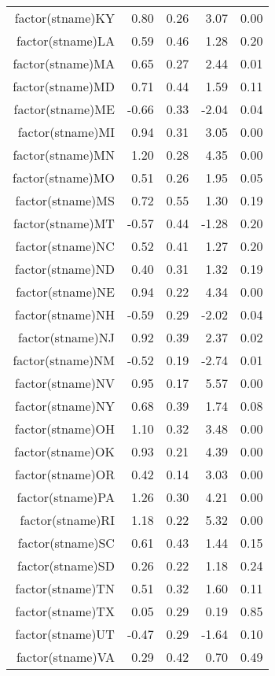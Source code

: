 \begin{table}[ht]
\begin{tabular}{rrrrr}
  factor(stname)KY & 0.80 & 0.26 & 3.07 & 0.00 \\ 
  factor(stname)LA & 0.59 & 0.46 & 1.28 & 0.20 \\ 
  factor(stname)MA & 0.65 & 0.27 & 2.44 & 0.01 \\ 
  factor(stname)MD & 0.71 & 0.44 & 1.59 & 0.11 \\ 
  factor(stname)ME & -0.66 & 0.33 & -2.04 & 0.04 \\ 
  factor(stname)MI & 0.94 & 0.31 & 3.05 & 0.00 \\ 
  factor(stname)MN & 1.20 & 0.28 & 4.35 & 0.00 \\ 
  factor(stname)MO & 0.51 & 0.26 & 1.95 & 0.05 \\ 
  factor(stname)MS & 0.72 & 0.55 & 1.30 & 0.19 \\ 
  factor(stname)MT & -0.57 & 0.44 & -1.28 & 0.20 \\ 
  factor(stname)NC & 0.52 & 0.41 & 1.27 & 0.20 \\ 
  factor(stname)ND & 0.40 & 0.31 & 1.32 & 0.19 \\ 
  factor(stname)NE & 0.94 & 0.22 & 4.34 & 0.00 \\ 
  factor(stname)NH & -0.59 & 0.29 & -2.02 & 0.04 \\ 
  factor(stname)NJ & 0.92 & 0.39 & 2.37 & 0.02 \\ 
  factor(stname)NM & -0.52 & 0.19 & -2.74 & 0.01 \\ 
  factor(stname)NV & 0.95 & 0.17 & 5.57 & 0.00 \\ 
  factor(stname)NY & 0.68 & 0.39 & 1.74 & 0.08 \\ 
  factor(stname)OH & 1.10 & 0.32 & 3.48 & 0.00 \\ 
  factor(stname)OK & 0.93 & 0.21 & 4.39 & 0.00 \\ 
  factor(stname)OR & 0.42 & 0.14 & 3.03 & 0.00 \\ 
  factor(stname)PA & 1.26 & 0.30 & 4.21 & 0.00 \\ 
  factor(stname)RI & 1.18 & 0.22 & 5.32 & 0.00 \\ 
  factor(stname)SC & 0.61 & 0.43 & 1.44 & 0.15 \\ 
  factor(stname)SD & 0.26 & 0.22 & 1.18 & 0.24 \\ 
  factor(stname)TN & 0.51 & 0.32 & 1.60 & 0.11 \\ 
  factor(stname)TX & 0.05 & 0.29 & 0.19 & 0.85 \\ 
  factor(stname)UT & -0.47 & 0.29 & -1.64 & 0.10 \\ 
  factor(stname)VA & 0.29 & 0.42 & 0.70 & 0.49 \\ 

\end{tabular}
\end{table}
